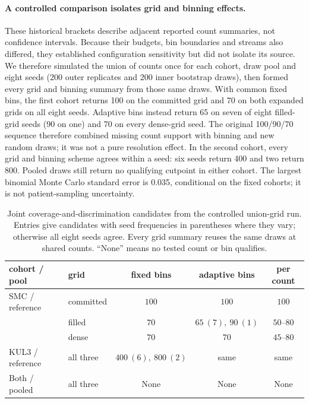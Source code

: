 \paragraph{A controlled comparison isolates grid and binning effects.}
These historical brackets describe adjacent reported count summaries, not
confidence intervals. Because their budgets, bin boundaries and streams also
differed, they established configuration sensitivity but did not isolate its
source. We therefore simulated the union of counts once for each cohort, draw
pool and eight seeds (200 outer replicates and 200 inner bootstrap draws), then
formed every grid and binning summary from those same draws. With common fixed
bins, the first cohort returns 100 on the committed grid and 70 on both expanded
grids on all eight seeds. Adaptive bins instead return 65 on seven of eight
filled-grid seeds (90 on one) and 70 on every dense-grid seed. The original
100/90/70 sequence therefore combined missing count support with binning and
new random draws; it was not a pure resolution effect. In the second cohort,
every grid and binning scheme agrees within a seed: six seeds return 400 and two
return 800. Pooled draws still return no qualifying cutpoint in either cohort.
The largest binomial Monte Carlo standard error is 0.035, conditional on the
fixed cohorts; it is not patient-sampling uncertainty.

\begin{table}[htbp]
\centering\small
\caption{Joint coverage-and-discrimination candidates from the controlled
union-grid run. Entries give candidates with seed frequencies in parentheses
where they vary; otherwise all eight seeds agree. Every grid summary reuses the
same draws at shared counts. ``None'' means no tested count or bin qualifies.}
\label{tab:controlledgrid}
\begin{tabular}{@{}llccc@{}}
\toprule
cohort / pool & grid & fixed bins & adaptive bins & per count \\
\midrule
SMC / reference & committed & $100$ & $100$ & $100$ \\
 & filled & $70$ & $65\ (7),\ 90\ (1)$ & $50$--$80$ \\
 & dense & $70$ & $70$ & $45$--$80$ \\
KUL3 / reference & all three & $400\ (6),\ 800\ (2)$ & same & same \\
Both / pooled & all three & None & None & None \\
\bottomrule
\end{tabular}
\end{table}

